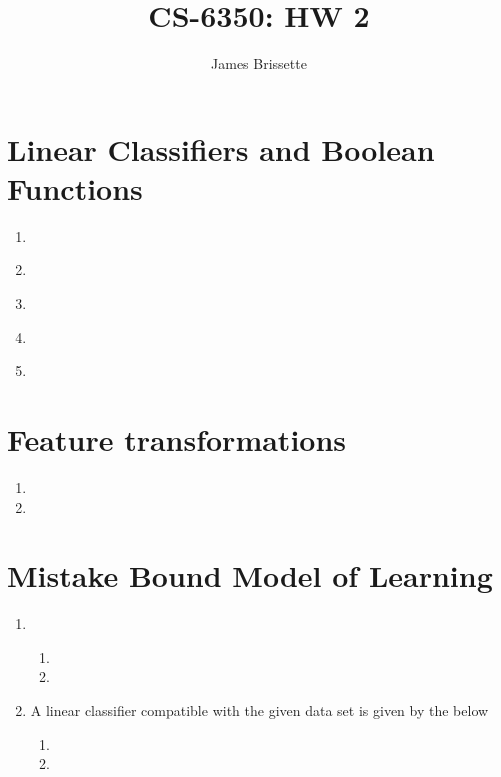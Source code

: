 \documentclass[11pt,a4paper]{article}
\author{James Brissette}
\title{CS-6350: HW 2}
\begin{document}
	\maketitle
	
	\section{Linear Classifiers and Boolean Functions}
		\begin{enumerate}
			\item $ $
			\item $ $
			\item $ $
			\item $ $
			\item $ $
		\end{enumerate}
	
	\section{Feature transformations}
		\begin{enumerate}
			\item 
			\item 
		\end{enumerate}
	
	\section{Mistake Bound Model of Learning}
		\begin{enumerate}
			\item $ $
			\begin{enumerate}
				\item
				\item
			\end{enumerate}
			\item A linear classifier compatible with the given data set is given by the below
			\begin{enumerate}
				\item
				\item
			\end{enumerate}
		\end{enumerate}
	
\end{document}
